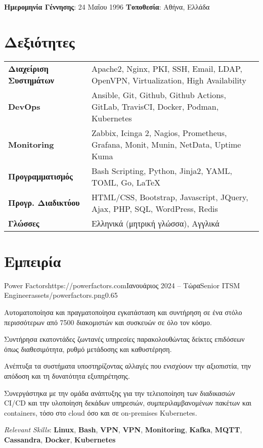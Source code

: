 \documentclass{mycv}
\begin{document}
	\pagestyle{empty}
	\begin{center}
		\textbf{Ημερομηνία Γέννησης}: 24 Μαΐου 1996 {\Large\textperiodcentered} \textbf{Τοποθεσία}: Αθήνα, Ελλάδα
	\end{center}
	
	\section{Δεξιότητες}
	\begin{tabular}{m{4.5cm} m{12.5cm}}
	\textbf{Διαχείριση Συστημάτων} & Apache2, Nginx, PKI, SSH, Email, LDAP, OpenVPN, Virtualization, High Availability \\
	\textbf{DevOps}	               & Ansible, Git, Github, Github Actions, GitLab, TravisCI, Docker, Podman, Kubernetes \\
	\textbf{Monitoring}            & Zabbix, Icinga 2, Nagios, Prometheus, Grafana, Monit, Munin, NetData, Uptime Kuma \\
	\textbf{Προγραμματισμός} 	   & Bash Scripting, Python, Jinja2, YAML, TOML, Go, \LaTeX \\
	\textbf{Προγρ. Διαδικτύου}	   & HTML/CSS, Bootstrap, Javascript, JQuery, Ajax, PHP, SQL, WordPress, Redis \\
	\textbf{Γλώσσες} 			   & Ελληνικά (μητρική γλώσσα), Αγγλικά 
	\end{tabular}

	\section{Εμπειρία}

	\begin{EntryDatedLogo}{Power Factors}{https://powerfactors.com}{Ιανουάριος 2024 -- Τώρα}{Senior ITSM Engineer}{assets/powerfactors.png}{0.65}
		\begin{Itemize}
			\item Αυτοματοποίησα και πραγματοποίησα εγκατάσταση και συντήρηση σε ένα στόλο περισσότερων από 7500 διακομιστών και συσκευών σε όλο τον κόσμο.
			\item Συντήρησα εκατοντάδες ζωντανές υπηρεσίες παρακολουθώντας δείκτες επιδόσεων όπως διαθεσιμότητα, ρυθμό μετάδοσης και καθυστέρηση.
			\item Ανέπτυξα τα συστήματα υποστηρίζοντας αλλαγές που ενισχύουν την αξιοπιστία, την απόδοση και τη δυνατότητα εξυπηρέτησης.
			\item Συνεργάστηκα με την ομάδα ανάπτυξης για την τελειοποίηση των διαδικασιών CI/CD και την υλοποίηση δεκάδων υπηρεσιών, συμπεριλαμβανομένων πακέτων και containers, τόσο στο cloud όσο και σε on-premises Kubernetes.
		\end{Itemize}
		\vspace{-0.3cm}
		\textit{Relevant Skills}: \textbf{Linux}, \textbf{Bash}, \textbf{VPN}, \textbf{VPN}, \textbf{Monitoring}, \textbf{Kafka}, \textbf{MQTT}, \textbf{Cassandra}, \textbf{Docker}, \textbf{Kubernetes}
	\end{EntryDatedLogo}
	
\end{document}
